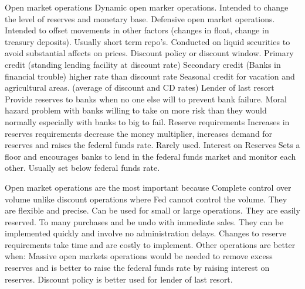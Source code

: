 \documentclass[12pt]{examnotes}
\begin{document}
 Open market operations
\rna Dynamic open marker operations. Intended to change the level of reserves and monetary base.
\rna Defensive open market operations. Intended to offset movements in other factors (changes in float, change in treasury deposits). Usually short term repo's.
\rna Conducted on liquid securities to avoid substantial affects on prices.
 Discount policy or discount window. 
\rna Primary credit (standing lending facility at discount rate)
\rna Secondary credit (Banks in financial trouble) higher rate than discount rate 
\rna Seasonal credit for vacation and agricultural areas. (average of discount and CD rates)
 Lender of last resort
\rna Provide reserves to banks when no one else will to prevent bank failure.
\rna Moral hazard problem with banks willing to take on more risk than they would normally especially with banks to big to fail.
 Reserve requirements
\rna Increases in reserves requirements decrease the money multiplier, increases demand for reserves and raises the federal funds rate.
\rna Rarely used.
 Interest on Reserves
\rna Sets a floor and encourages banks to lend in the federal funds market and monitor each other. 
\rna Usually set below federal funds rate.

\ra Open market operations are the most important because
 Complete control over volume unlike discount operations where Fed cannot control the volume.
 They are flexible and precise. Can be used for small or large operations.
 They are easily reserved. To many purchases and be undo with immediate sales.
 They can be implemented quickly and involve no administration delays. Changes to reserve requirements take time and are costly to implement.
\ra Other operations are better when:
\rna Massive open markets operations would be needed to remove excess reserves and is better to raise the federal funds rate by raising interest on reserves.
\rna Discount policy is better used for lender of last resort.
\end{document}

